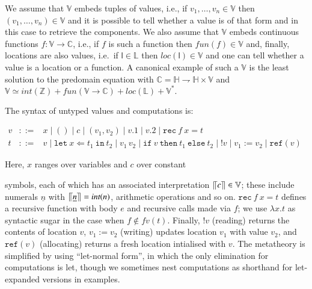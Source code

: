 \documentclass[orivec]{llncs}
\newif\iffull\fullfalse
\renewcommand{\paragraph}[1]{\noindent {\bf #1}}
\newcommand{\keywd}[1]{\mathtt{#1}}
\newcommand{\myread}[1]{!{#1}}
\newcommand{\myref}[1]{\keywd{ref}(#1)}
\newcommand{\intt}[1]{\textit{int}(#1)}
\newcommand{\reff}[1]{\textit{loc}(#1)}
\newcommand{\funn}[1]{\textit{fun}(#1)}
\newcommand{\partfun}{\rightharpoondown}
\newcommand{\labs}{\mathbb{L}}
\newcommand{\vfix}[3]{\keywd{rec}\:{#1}\:{#2} = {#3}}
\newcommand{\letin}[2]{\keywd{let}\:{#1}\!\Leftarrow\!{#2}\:\keywd{in}\:}
\newcommand{\assign}[2]{{#1}:={#2}}
\newcommand{\myif}[3]{\keywd{if}\ #1\ \keywd{then}\ #2\
  \keywd{else}\ #3}
\newcommand{\Stores}{\ensuremath{\mathbb{H}}}
\newcommand{\semV}[1]{\ensuremath{\llceil {#1} \rrceil
}}
\newcommand{\cloc}{\ensuremath{\mathsf{l}}\xspace}
\newcommand{\Values}{\mathbb{V}}
\newcommand{\Comps}{\mathbb{C}}
\begin{document}
We assume that $\Values$ embeds tuples of values, i.e., if
$v_1,\dots,v_n\in\Values$ then $(v_1,\dots,v_n)\in\Values$ and it is
possible to tell whether a value is of that form and in this case to
retrieve the components. We also assume that $\Values$ embeds
continuous functions $f:\Values\rightarrow \Comps$, i.e., if $f$ is
such a function then $\funn f\in\Values$ and, finally, locations are
also values, i.e.\ if $\cloc\in\labs$ then $\reff\cloc\in\Values$ and
one can tell whether a value is a location or a function. A canonical
example of
such a $\Values$ is the least solution to the predomain equation 
with $\Comps=\Stores\partfun\Stores\times \Values$ and
\(
\Values \simeq \intt{\mathbb{Z}} + \funn{\Values\rightarrow\Comps} +
\reff{\labs} + \Values^*.
\)

\paragraph{Syntax}
The syntax of untyped values and computations is:
\iffull
\[
 \begin{array}{lcl}
v & ::= & x \mid () \mid c \mid (v_1,v_2) \mid v.1 \mid v.2 \mid
\vfix{f}{x}{t} \\
t &::=& v \mid \letin{x}{t_1}{t_2}\mid v_1\,v_2 \mid
\myif{v}{t_1}{t_2} \mid
\myread{v}\mid \assign{v_1}{v_2}\mid \myref{v}
 \end{array}
\]
Here, $x$ ranges over variables and $c$ over constant
\else

\(
 \begin{array}{lcl}
v & ::= & x \mid () \mid c \mid (v_1,v_2) \mid v.1 \mid v.2 \mid
\vfix{f}{x}{t} \\
t &::=& v \mid \letin{x}{t_1}{t_2}\mid v_1\,v_2 \mid
\myif{v}{t_1}{t_2} \mid
\myread{v}\mid \assign{v_1}{v_2}\mid \myref{v}
 \end{array}
\)

\noindent
Here, $x$ ranges over variables and $c$ over constant
\fi
symbols, each of which has an associated interpretation
$\semV{c}\in\Values$; these include numerals $\underline{n}$ with
$\semV{\underline{n}} = \intt{n}$, arithmetic operations and so on.
$\vfix{f}{x}{t}$ defines a recursive function with body $e$ and
recursive calls made via $f$; we use $\lambda x.t$ as syntactic sugar in
the
case when $f\not\in fv(t)$. Finally, $\myread{v}$ (reading) returns
the contents of location $v$, $\assign{v_1}{v_2}$ (writing) updates
location $v_1$ with value $v_2$, and $\myref{v}$ (allocating) returns a
fresh location intialised with $v$. The metatheory is simplified by
using ``let-normal form'', in which the only elimination for
computations is let, though we sometimes nest computations as
shorthand for let-expanded versions in examples.
\end{document}
